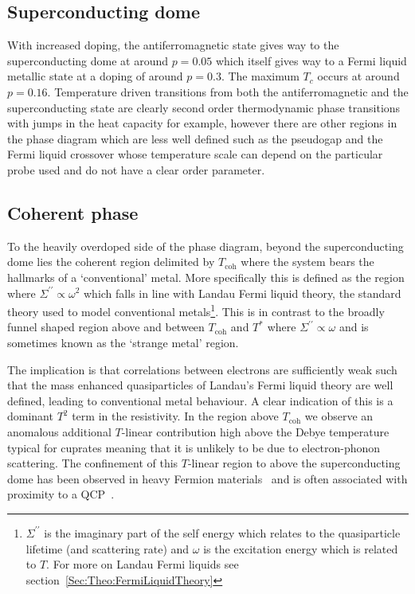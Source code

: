 \subsection{Superconducting dome}

With increased doping, the antiferromagnetic state gives way to the superconducting dome at around $p=0.05$ which itself gives way to a Fermi liquid metallic state at a doping of around $p=0.3$. The maximum $T_c$ occurs at around $p=0.16$. Temperature driven transitions from both the antiferromagnetic and the superconducting state are clearly second order thermodynamic phase transitions with jumps in the heat capacity for example, however there are other regions in the phase diagram which are less well defined such as the pseudogap and the Fermi liquid crossover whose temperature scale can depend on the particular probe used and do not have a clear order parameter.

\subsection{Coherent phase}

To the heavily overdoped side of the phase diagram, beyond the superconducting dome lies the coherent region delimited by $T_{\textrm{coh}}$ where the system bears the hallmarks of a `conventional' metal. More specifically this is defined as the region where $\Sigma^{\prime\prime} \propto \omega^2$ which falls in line with Landau Fermi liquid theory, the standard theory used to model conventional metals\footnote{$\Sigma^{\prime\prime}$ is the imaginary part of the self energy which relates to the quasiparticle lifetime (and scattering rate) and $\omega$ is the excitation energy which is related to $T$. For more on Landau Fermi liquids see section~\ref{Sec:Theo:FermiLiquidTheory}}. This is in contrast to the broadly funnel shaped region above and between $T_{\textrm{coh}}$ and $T^*$ where $\Sigma^{\prime\prime} \propto \omega$ and is sometimes known as the `strange metal' region.

 The implication is that correlations between electrons are sufficiently weak such that the mass enhanced quasiparticles of Landau's Fermi liquid theory are well defined, leading to conventional metal behaviour. A clear indication of this is a dominant $T^2$ term in the resistivity. In the region above $T_{\textrm{coh}}$ we observe an anomalous additional $T$-linear contribution high above the Debye temperature typical for cuprates meaning that it is unlikely to be due to electron-phonon scattering. The confinement of this $T$-linear region to above the superconducting dome has been observed in heavy Fermion materials~\cite{Custers2003} and is often associated with proximity to a \ac{QCP}~\cite{Hussey2008}.

